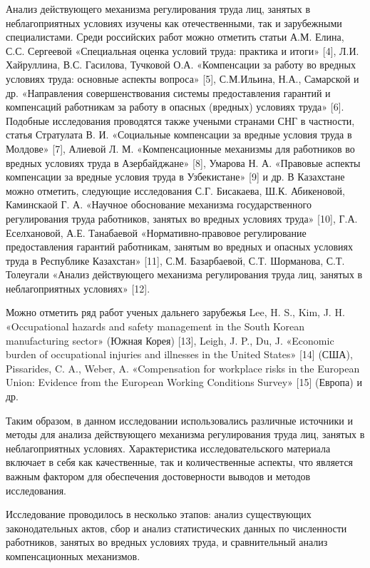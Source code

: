 Анализ действующего механизма регулирования труда лиц, занятых в
неблагоприятных условиях изучены как отечественными, так и зарубежными
специалистами. Среди российских работ можно отметить статьи А.М. Елина,
С.С. Сергеевой «Специальная оценка условий труда: практика и итоги»
{[}4{]}, Л.И. Хайруллина, В.С. Гасилова, Тучковой О.А. «Компенсации за
работу во вредных условиях труда: основные аспекты вопроса» {[}5{]},
С.М.Ильина, Н.А., Самарской и др. «Направления совершенствования системы
предоставления гарантий и компенсаций работникам за работу в опасных
(вредных) условиях труда» {[}6{]}. Подобные исследования проводятся
также учеными странами СНГ в частности, статья Стратулата В. И.
«Социальные компенсации за вредные условия труда в Молдове» {[}7{]},
Алиевой Л. М. «Компенсационные механизмы для работников во вредных
условиях труда в Азербайджане» {[}8{]}, Умарова Н. А. «Правовые аспекты
компенсации за вредные условия труда в Узбекистане» {[}9{]} и др. В
Казахстане можно отметить, следующие исследования С.Г. Бисакаева, Ш.К.
Абикеновой, Каминскаой Г. А. «Научное обоснование механизма
государственного регулирования труда работников, занятых во вредных
условиях труда» {[}10{]}, Г.А. Еселхановой, А.Е. Танабаевой
«Нормативно-правовое регулирование предоставления гарантий работникам,
занятым во вредных и опасных условиях труда в Республике Казахстан»
{[}11{]}, С.М. Базарбаевой, С.Т. Шорманова, С.Т. Толеугали «Анализ
действующего механизма регулирования труда лиц, занятых в
неблагоприятных условиях» {[}12{]}.

Можно отметить ряд работ ученых дальнего зарубежья Lee, H. S., Kim, J.
H. «Occupational hazards and safety management in the South Korean
manufacturing sector» (Южная Корея) {[}13{]}, Leigh, J. P., Du, J.
«Economic burden of occupational injuries and illnesses in the United
States» {[}14{]} (США), Pissarides, C. A., Weber, A. «Compensation for
workplace risks in the European Union: Evidence from the European
Working Conditions Survey» {[}15{]} (Европа) и др.

Таким образом, в данном исследовании использовались различные источники
и методы для анализа действующего механизма регулирования труда лиц,
занятых в неблагоприятных условиях. Характеристика исследовательского
материала включает в себя как качественные, так и количественные
аспекты, что является важным фактором для обеспечения достоверности
выводов и методов исследования.

Исследование проводилось в несколько этапов: анализ существующих
законодательных актов, сбор и анализ статистических данных по
численности работников, занятых во вредных условиях труда, и
сравнительный анализ компенсационных механизмов.

